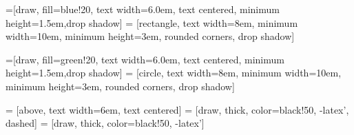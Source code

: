 \usetikzlibrary{shadows,arrows}
 
=[draw, fill=blue!20, text width=6.0em, text centered,
  minimum height=1.5em,drop shadow]
 = [rectangle, text width=8em, minimum width=10em,
  minimum height=3em, rounded corners, drop shadow]

=[draw, fill=green!20, text width=6.0em, text centered,
  minimum height=1.5em,drop shadow]
 = [circle, text width=8em, minimum width=10em,
  minimum height=3em, rounded corners, drop shadow]
 
 = [above, text width=6em, text centered]
 = [draw, thick, color=black!50, -latex', dashed]
 = [draw, thick, color=black!50, -latex']
 

\newcommand{\practica}[3]{node (p#1) [practica] {#2 \\ \scriptsize\textit{#3}}}
\newcommand{\implemented}[3]{node (p#1) [interface] {#2 \\ \scriptsize\textit{#3}}}

\newcommand{\background}[5]{%
  \begin{pgfonlayer}{background}
    \path (#1.west |- #2.north)+(-0.5,0.5) node (a1) {};
    \path (#3.east |- #4.south)+(+0.5,-0.25) node (a2) {};
    \path[fill=yellow!20,rounded corners, draw=black!50, dashed]
      (a1) rectangle (a2);
    \path (a1.east |- a1.south)+(0.8,-0.3) node (u1)[texto]
      {\scriptsize\textit{#5}};
  \end{pgfonlayer}}

\newcommand{\transreceptor}[3]{%
  \path [linepart] (#1.east) -- node [above]
    {\scriptsize Transreceptor #2} (#3);}

